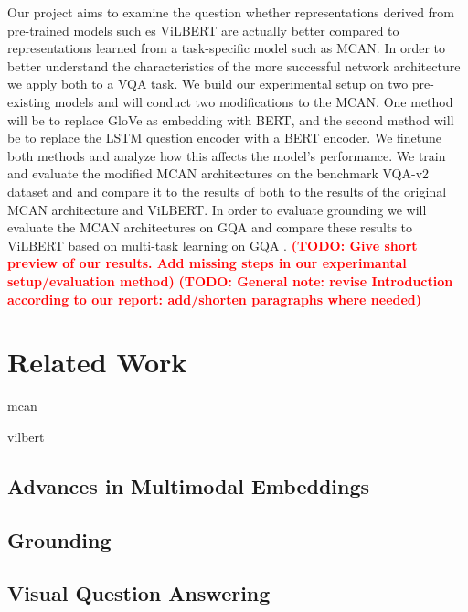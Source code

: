 \documentclass{article}
\newcommand{\todo}[1]{\textbf{\textcolor{Red}{(TODO: #1)}}}
\begin{document}
Our project aims to examine the question whether representations derived from pre-trained models such es ViLBERT are actually better compared to representations learned from a task-specific model such as MCAN. In order to better understand the characteristics of the more successful network architecture we apply both to a VQA task. We build our experimental setup on two pre-existing models and will conduct two modifications to the MCAN. One method will be to replace GloVe as embedding with BERT, and the second method will be to replace the LSTM question encoder with a BERT encoder. We finetune both methods and analyze how this affects the model’s performance. We train and evaluate the modified MCAN architectures on the benchmark VQA-v2 dataset \citep{goyal2016vqa2} and and compare it to the results of both to the results of the original MCAN architecture and ViLBERT. In order to evaluate grounding we will evaluate the MCAN architectures on GQA and compare these results to ViLBERT based on multi-task learning on GQA \citep{lu2020multitask}. \todo{Give short preview of our results. Add missing steps in our experimantal setup/evaluation method}
\todo{General note: revise Introduction according to our report: add/shorten paragraphs where needed}

\section{Related Work}

mcan\citep{yu2019mcan}

vilbert\citeauthor{lu2019vilbert}

\subsection{Advances in Multimodal Embeddings}

\subsection{Grounding}

\subsection{Visual Question Answering}
\end{document}
